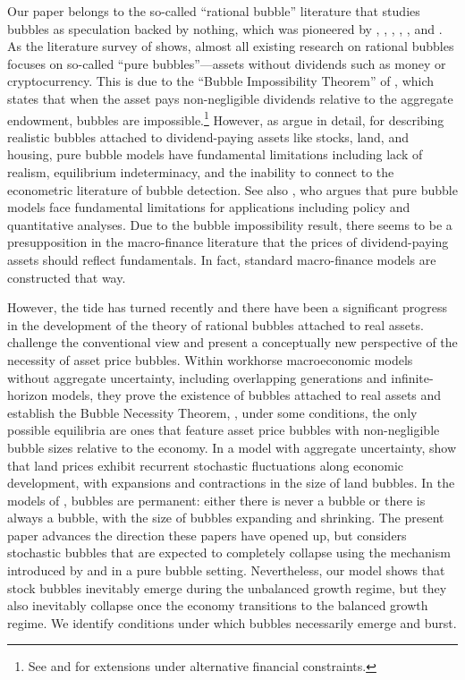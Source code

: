 \documentclass[a4paper,12pt]{article}
\numberwithin{equation}{section}
\theoremstyle{plain}
\begin{document}
Our paper belongs to the so-called ``rational bubble'' literature that studies bubbles as speculation backed by nothing, which was pioneered by \citet{Samuelson1958}, \citet{Bewley1980}, \citet{Tirole1985}, \citet{ScheinkmanWeiss1986}, \citet{Kocherlakota1992}, and \citet{SantosWoodford1997}. As the literature survey of \citet{HiranoToda2024JME} shows, almost all existing research on rational bubbles focuses on so-called ``pure bubbles''---assets without dividends such as money or cryptocurrency. This is due to the ``Bubble Impossibility Theorem'' of \citet[Theorem 3.3, Corollary 3.4]{SantosWoodford1997}, which states that when the asset pays non-negligible dividends relative to the aggregate endowment, bubbles are impossible.\footnote{See \citet{Kocherlakota2008} and \citet{Werner2014} for extensions under alternative financial constraints.} However, as \citet[\S4.7]{HiranoToda2024JME} argue in detail, for describing realistic bubbles attached to dividend-paying assets like stocks, land, and housing, pure bubble models have fundamental limitations including lack of realism, equilibrium indeterminacy, and the inability to connect to the econometric literature of bubble detection. See also \citet{Barlevy2018}, who argues that pure bubble models face fundamental limitations for applications including policy and quantitative analyses. Due to the \citet{SantosWoodford1997} bubble impossibility result, there seems to be a presupposition in the macro-finance literature that the prices of dividend-paying assets should reflect fundamentals. In fact, standard macro-finance models are constructed that way.

However, the tide has turned recently and there have been a significant progress in the development of the theory of rational bubbles attached to real assets. \citet{HiranoToda2025JPE} challenge the conventional view and present a conceptually new perspective of the necessity of asset price bubbles. Within workhorse macroeconomic models without aggregate uncertainty, including overlapping generations and infinite-horizon models, they prove the existence of bubbles attached to real assets and establish the Bubble Necessity Theorem, \ie, under some conditions, the only possible equilibria are ones that feature asset price bubbles with non-negligible bubble sizes relative to the economy. In a model with aggregate uncertainty, \citet{HiranoToda2025PNAS} show that land prices exhibit recurrent stochastic fluctuations along economic development, with expansions and contractions in the size of land bubbles. In the models of \citet{HiranoToda2025JPE,HiranoToda2025PNAS}, bubbles are permanent: either there is never a bubble or there is always a bubble, with the size of bubbles expanding and shrinking. The present paper advances the direction these papers have opened up, but considers stochastic bubbles that are expected to completely collapse using the mechanism introduced by \citet{Blanchard1979} and \citet{Weil1987} in a pure bubble setting. Nevertheless, our model shows that stock bubbles inevitably emerge during the unbalanced growth regime, but they also inevitably collapse once the economy transitions to the balanced growth regime. We identify conditions under which bubbles necessarily emerge and burst. 
\end{document}
